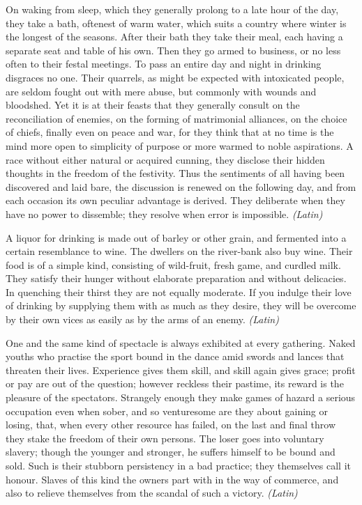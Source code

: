 
On waking from sleep, which they generally prolong to a late hour of the day, they take a bath, oftenest of warm water, which suits a country where winter is the longest of the seasons. After their bath they take their meal, each having a separate seat and table of his own. Then they go armed to business, or no less often to their festal meetings. To pass an entire day and night in drinking disgraces no one. Their quarrels, as might be expected with intoxicated people, are seldom fought out with mere abuse, but commonly with wounds and bloodshed. Yet it is at their feasts that they generally consult on the reconciliation of enemies, on the forming of matrimonial alliances, on the choice of chiefs, finally even on peace and war, for they think that at no time is the mind more open to simplicity of purpose or more warmed to noble aspirations. A race without either natural or acquired cunning, they disclose their hidden thoughts in the freedom of the festivity. Thus the sentiments of all having been discovered and laid bare, the discussion is renewed on the following day, and from each occasion its own peculiar advantage is derived. They deliberate when they have no power to dissemble; they resolve when error is impossible. \emph{(Latin)}


A liquor for drinking is made out of barley or other grain, and fermented into a certain resemblance to wine. The dwellers on the river-bank also buy wine. Their food is of a simple kind, consisting of wild-fruit, fresh game, and curdled milk. They satisfy their hunger without elaborate preparation and without delicacies. In quenching their thirst they are not equally moderate. If you indulge their love of drinking by supplying them with as much as they desire, they will be overcome by their own vices as easily as by the arms of an enemy. \emph{(Latin)}


One and the same kind of spectacle is always exhibited at every gathering. Naked youths who practise the sport bound in the dance amid swords and lances that threaten their lives. Experience gives them skill, and skill again gives grace; profit or pay are out of the question; however reckless their pastime, its reward is the pleasure of the spectators. Strangely enough they make games of hazard a serious occupation even when sober, and so venturesome are they about gaining or losing, that, when every other resource has failed, on the last and final throw they stake the freedom of their own persons. The loser goes into voluntary slavery; though the younger and stronger, he suffers himself to be bound and sold. Such is their stubborn persistency in a bad practice; they themselves call it honour. Slaves of this kind the owners part with in the way of commerce, and also to relieve themselves from the scandal of such a victory. \emph{(Latin)}


